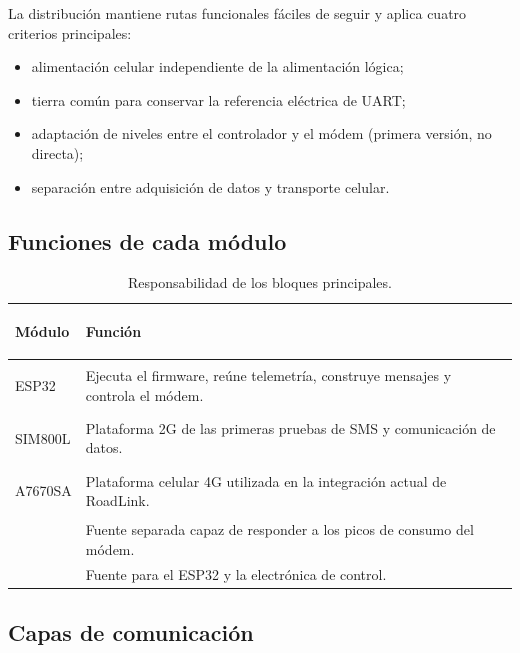 \documentclass[11pt,letterpaper]{article}
\begin{document}
La distribución mantiene rutas funcionales fáciles de seguir y aplica cuatro
criterios principales:

\begin{itemize}
  \item alimentación celular independiente de la alimentación lógica;
  \item tierra común para conservar la referencia eléctrica de UART;
  \item adaptación de niveles entre el controlador y el módem (primera versión, no directa);
  \item separación entre adquisición de datos y transporte celular.
\end{itemize}

\subsection{Funciones de cada módulo}

\begin{table}[H]
  \centering
  \caption{Responsabilidad de los bloques principales.}
  \begin{tabularx}{\textwidth}{>{\bfseries\raggedright\arraybackslash}p{4.1cm} Y}
    \toprule
    Módulo & Función \\
    \midrule
    ESP32 & Ejecuta el firmware, reúne telemetría, construye mensajes y controla el módem. \\
    SIM800L & Plataforma 2G de las primeras pruebas de SMS y comunicación de datos. \\
    A7670SA & Plataforma celular 4G utilizada en la integración actual de RoadLink. \\
     & Fuente separada capaz de responder a los picos de consumo del módem. \\
     & Fuente para el ESP32 y la electrónica de control. \\
    \bottomrule
  \end{tabularx}
\end{table}

\subsection{Capas de comunicación}
\end{document}
